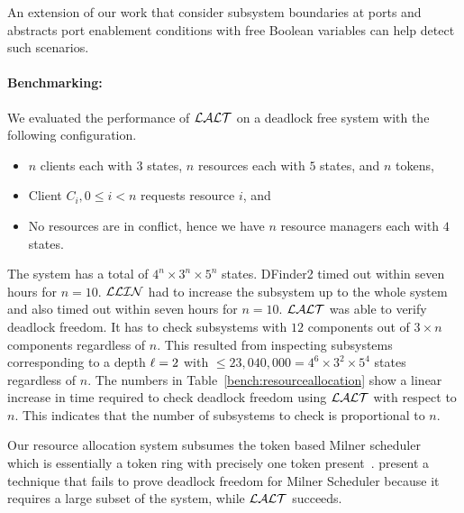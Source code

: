An extension of our work that consider subsystem boundaries at ports and abstracts port enablement 
conditions with free Boolean variables can help
detect such scenarios. 

\begin{table}
\label{bench:resourceallocation}
\end{table}

\paragraph{Benchmarking:}

We evaluated the performance of $\mathcal{LALT}$ on a deadlock free system with the following configuration. 
\begin{itemize}
\item $n$ clients each with $3$ states, $n$ resources each with $5$ states, and $n$ tokens,
\item Client $C_i, 0\leq i < n$ requests resource $i$, and 
\item No resources are in conflict, hence we have $n$ resource managers each with $4$ states. 
\end{itemize}

The system has a total of $4^n \times 3^n \times 5^n$ states. 
DFinder2 timed out within seven hours for $n=10$. 
$\mathcal{LLIN}$ had to increase the subsystem up to the whole system and also timed out within seven hours for $n=10$. 
$\mathcal{LALT}$ was able to verify deadlock freedom. It has to check subsystems with $12$ components out of $3\times n$ components regardless of $n$. 
This resulted from inspecting subsystems corresponding to a depth $\ell=2$ with $\leq 23,040,000=4^{6} \times 3^2\times 5^4$ states regardless of $n$.
The numbers in Table~\ref{bench:resourceallocation} show a linear increase in time required to check deadlock freedom 
using $\mathcal{LALT}$ with respect to $n$. This indicates that the number of subsystems to check is proportional to $n$. 

Our resource allocation system subsumes the token based Milner scheduler~\cite{milner} which 
is essentially a token ring with precisely one token present~\cite{AGR16}. 
\cite{AGR16} present a technique that fails to prove deadlock freedom for Milner Scheduler 
because it requires a large subset of the system, 
while $\mathcal{LALT}$ succeeds. 
